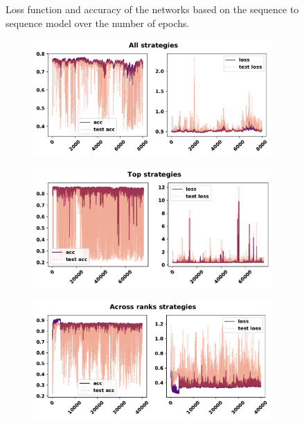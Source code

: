 \begin{figure}[!htbp]
\begin{subfigure}{\textwidth}
    \end{subfigure}
    \caption{Loss function and accuracy of the networks based on the sequence to sequence
    model over the number of epochs.}\label{fig:validation_sequence_to_sequence}
\end{figure}

\begin{figure}[!htbp]
    \begin{subfigure}{\textwidth}
    \centering
    \includegraphics[width=.8\textwidth]{src/chapters/07/img/validation_plot_classification_all_strategies.pdf}
    \end{subfigure}\hfill
    \begin{subfigure}{\textwidth}
    \centering
    \includegraphics[width=.8\textwidth]{src/chapters/07/img/validation_plot_classification_top_strategies.pdf}
    \end{subfigure}
    \begin{subfigure}{\textwidth}
    \centering
    \includegraphics[width=.8\textwidth]{src/chapters/07/img/validation_plot_classification_across_ranks_strategies.pdf}

\end{subfigure}
\end{figure}
